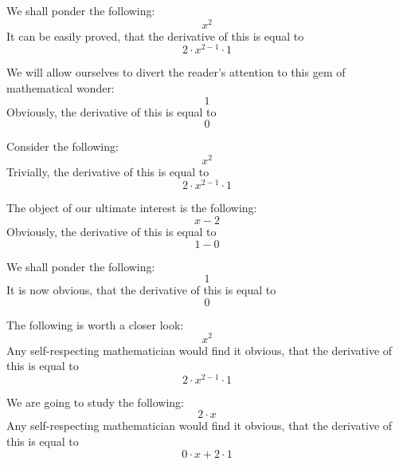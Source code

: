 \documentclass{article}
\begin{document}
We shall ponder the following:
\begin{equation}
x ^{2 } 
\end{equation}
It can be easily proved, that the derivative of this is equal to
\begin{equation}
2 \cdot x ^{2 - 1 } \cdot 1 
\end{equation}

We will allow ourselves to divert the reader's attention to this gem of mathematical wonder:
\begin{equation}
1 
\end{equation}
Obviously, the derivative of this is equal to
\begin{equation}
0 
\end{equation}

Consider the following:
\begin{equation}
x ^{2 } 
\end{equation}
Trivially, the derivative of this is equal to
\begin{equation}
2 \cdot x ^{2 - 1 } \cdot 1 
\end{equation}

The object of our ultimate interest is the following:
\begin{equation}
x - 2 
\end{equation}
Obviously, the derivative of this is equal to
\begin{equation}
1 - 0 
\end{equation}

We shall ponder the following:
\begin{equation}
1 
\end{equation}
It is now obvious, that the derivative of this is equal to
\begin{equation}
0 
\end{equation}

The following is worth a closer look:
\begin{equation}
x ^{2 } 
\end{equation}
Any self-respecting mathematician would find it obvious, that the derivative of this is equal to
\begin{equation}
2 \cdot x ^{2 - 1 } \cdot 1 
\end{equation}

We are going to study the following:
\begin{equation}
2 \cdot x 
\end{equation}
Any self-respecting mathematician would find it obvious, that the derivative of this is equal to
\begin{equation}
0 \cdot x + 2 \cdot 1 
\end{equation}
\end{document}
